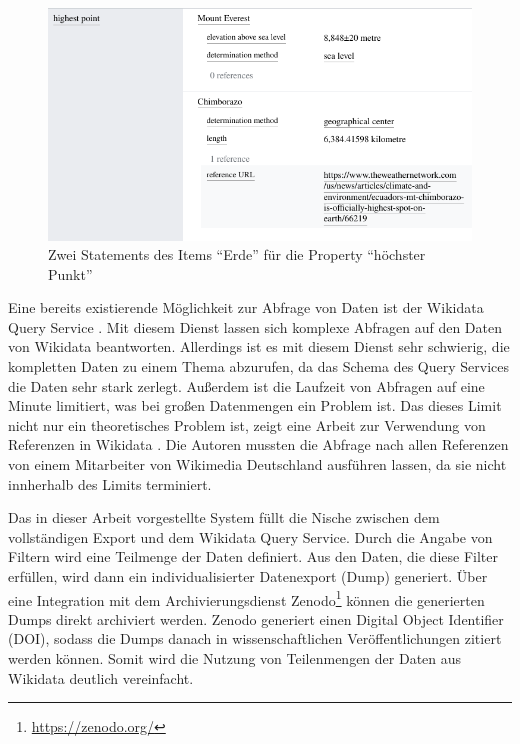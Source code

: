 \begin{figure}
  \includegraphics[width=\linewidth]{pics/example-statement}
  \caption{Zwei Statements des Items "`Erde"' für die Property "`höchster Punkt"'}
  \label{fig:sample-statement}
\end{figure} 

Eine bereits existierende Möglichkeit zur Abfrage von Daten ist der Wikidata Query Service \cite{wd-sparql}. 
Mit diesem Dienst lassen sich komplexe Abfragen auf den Daten von Wikidata beantworten.
Allerdings ist es mit diesem Dienst sehr schwierig, die kompletten Daten zu einem Thema abzurufen, da das Schema des Query Services die Daten sehr stark zerlegt.
Außerdem ist die Laufzeit von Abfragen auf eine Minute limitiert, was bei großen Datenmengen ein Problem ist.
Das dieses Limit nicht nur ein theoretisches Problem ist, zeigt eine Arbeit zur Verwendung von Referenzen in Wikidata \cite{wd-wk-common-references}.
Die Autoren mussten die Abfrage nach allen Referenzen von einem Mitarbeiter von Wikimedia Deutschland ausführen lassen, da sie nicht innherhalb des Limits terminiert.

Das in dieser Arbeit vorgestellte System füllt die Nische zwischen dem vollständigen Export und dem Wikidata Query Service.
Durch die Angabe von Filtern wird eine Teilmenge der Daten definiert.
Aus den Daten, die diese Filter erfüllen, wird dann ein individualisierter Datenexport (Dump) generiert.
Über eine Integration mit dem Archivierungsdienst Zenodo\footnote{\url{https://zenodo.org/}} können die generierten Dumps direkt archiviert werden.
Zenodo generiert einen Digital Object Identifier (DOI), sodass die Dumps danach in wissenschaftlichen Veröffentlichungen zitiert werden können.
Somit wird die Nutzung von Teilenmengen der Daten aus Wikidata deutlich vereinfacht.

